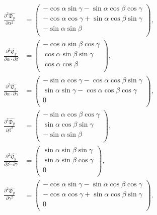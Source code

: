 \documentclass[a4paper,11pt,twoside,openright]{book}
\def\lthtmlcheckvsize{\ifdim\ht\sizebox<\vsize 
  \ifdim\wd\sizebox<\hsize\expandafter\hfill\fi \expandafter\vfill
  \else\expandafter\vss\fi}%
\begin{document}
{\newpage\clearpage
\setcounter{equation}{178}
%
\begin{subequations}\begin{align}
\frac{\partial^2 \widehat{\mathfrak{D}_y}}{\partial \alpha^2} &= \begin{pmatrix}
-\cos \alpha \sin \gamma - \sin \alpha \cos \beta \cos \gamma \\
-\cos \alpha \cos \gamma + \sin \alpha \cos \beta \sin \gamma \\
-\sin \alpha \sin \beta \\
\end{pmatrix}, \\
\frac{\partial^2 \widehat{\mathfrak{D}_y}}{\partial \alpha \cdot \partial \beta} &= \begin{pmatrix}
-\cos \alpha \sin \beta \cos \gamma \\
\cos \alpha \sin \beta \sin \gamma \\
\cos \alpha \cos \beta \\
\end{pmatrix}, \\
\frac{\partial^2 \widehat{\mathfrak{D}_y}}{\partial \alpha \cdot \partial \gamma} &= \begin{pmatrix}
-\sin \alpha \cos \gamma - \cos \alpha \cos \beta \sin \gamma \\
\sin \alpha \sin \gamma - \cos \alpha \cos \beta \cos \gamma \\
0 \\
\end{pmatrix}, \\
\frac{\partial^2 \widehat{\mathfrak{D}_y}}{\partial \beta^2} &= \begin{pmatrix}
-\sin \alpha \cos \beta \cos \gamma \\
\sin \alpha \cos \beta \sin \gamma \\
-\sin \alpha \sin \beta \\
\end{pmatrix}, \\
\frac{\partial^2 \widehat{\mathfrak{D}_y}}{\partial \beta \cdot \partial \gamma} &= \begin{pmatrix}
\sin \alpha \sin \beta \sin \gamma \\
\sin \alpha \sin \beta \cos \gamma \\
0 \\
\end{pmatrix}, \\
\frac{\partial^2 \widehat{\mathfrak{D}_y}}{\partial \gamma^2} &= \begin{pmatrix}
-\cos \alpha \sin \gamma - \sin \alpha \cos \beta \cos \gamma \\
-\cos \alpha \cos \gamma + \sin \alpha \cos \beta \sin \gamma \\
0 \\
\end{pmatrix}.
\end{align}\end{subequations}%
\lthtmldisplayZ
\lthtmlcheckvsize\clearpage}
\end{document}

